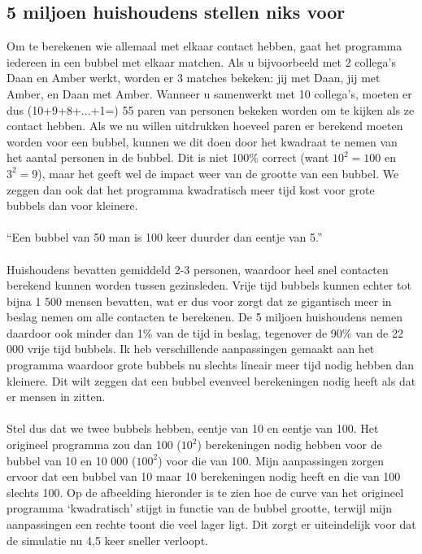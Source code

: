 \documentclass[10pt]{article} %
\begin{document}
\subsection*{5 miljoen huishoudens stellen niks voor}
Om te berekenen wie allemaal met elkaar contact hebben, gaat het programma iedereen in een bubbel met elkaar matchen. Als u bijvoorbeeld met 2 collega's Daan en Amber werkt, worden er 3 matches bekeken: jij met Daan, jij met Amber, en Daan met Amber. Wanneer u samenwerkt met 10 collega's, moeten er dus (10+9+8+...+1=) 55 paren van personen bekeken worden om te kijken als ze contact hebben. Als we nu willen uitdrukken hoeveel paren er berekend moeten worden voor een bubbel, kunnen we dit doen door het kwadraat te nemen van het aantal personen in de bubbel. Dit is niet 100\% correct (want $10^{2} = 100$ en $3^{2} = 9$), maar het geeft wel de impact weer van de grootte van een bubbel. We zeggen dan ook dat het programma kwadratisch meer tijd kost voor grote bubbels dan voor kleinere.
\\\\
{\Large ``Een bubbel van 50 man is 100 keer duurder dan eentje van 5.''}
\\\\
Huishoudens bevatten gemiddeld 2-3 personen, waardoor heel snel contacten berekend kunnen worden tussen gezinsleden. Vrije tijd bubbels kunnen echter tot bijna 1 500 mensen bevatten, wat er dus voor zorgt dat ze gigantisch meer in beslag nemen om alle contacten te berekenen. De 5 miljoen huishoudens nemen daardoor ook minder dan 1\% van de tijd in beslag, tegenover de 90\% van de 22 000 vrije tijd bubbels. Ik heb verschillende aanpassingen gemaakt aan het programma waardoor grote bubbels nu slechts lineair meer tijd nodig hebben dan kleinere. Dit wilt zeggen dat een bubbel evenveel berekeningen nodig heeft als dat er mensen in zitten.
\\\\
Stel dus dat we twee bubbels hebben, eentje van 10 en eentje van 100. Het origineel programma zou dan 100 ($10^{2}$) berekeningen nodig hebben voor de bubbel van 10 en 10 000 ($100^{2}$) voor die van 100. Mijn aanpassingen zorgen ervoor dat een bubbel van 10 maar 10 berekeningen nodig heeft en die van 100 slechts 100. Op de afbeelding hieronder is te zien hoe de curve van het origineel programma `kwadratisch' stijgt in functie van de bubbel grootte, terwijl mijn aanpassingen een rechte toont die veel lager ligt. Dit zorgt er uiteindelijk voor dat de simulatie nu 4,5 keer sneller verloopt.
\end{document}
